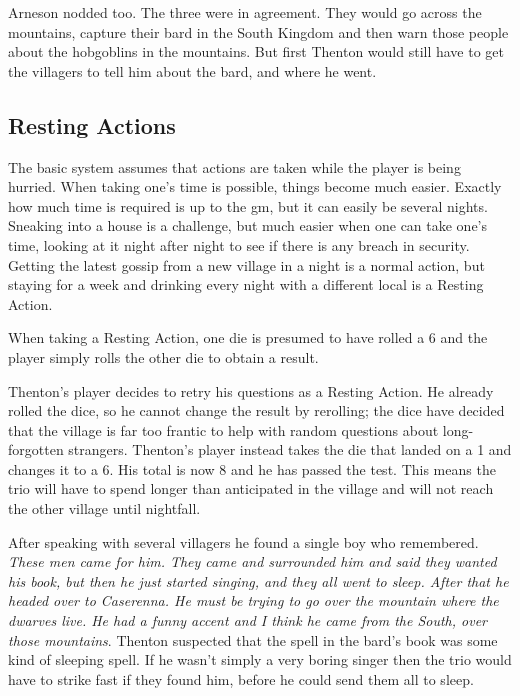 \begin{multicols}{2}
\begin{exampletext}
Arneson nodded too.
The three were in agreement.
They would go across the mountains, capture their bard in the South Kingdom and then warn those people about the hobgoblins in the mountains.
But first Thenton would still have to get the villagers to tell him about the bard, and where he went.\end{exampletext}

\subsection{Resting Actions}\label{restingactions}

The basic system assumes that actions are taken while the player is being hurried. When taking one's time is possible, things become much easier. Exactly how much time is required is up to the \gls{gm}, but it can easily be several nights. Sneaking into a house is a challenge, but much easier when one can take one's time, looking at it night after night to see if there is any breach in security. Getting the latest gossip from a new village in a night is a normal action, but staying for a week and drinking every night with a different local is a Resting Action.

When taking a Resting Action, one die is presumed to have rolled a 6 and the player simply rolls the other die to obtain a result.

\begin{exampletext}

	Thenton's player decides to retry his questions as a Resting Action. He already rolled the dice, so he cannot change the result by rerolling; the dice have decided that the village is far too frantic to help with random questions about long-forgotten strangers. Thenton's player instead takes the die that landed on a 1 and changes it to a 6. His total is now 8 and he has passed the test. This means the trio will have to spend longer than anticipated in the village and will not reach the other village until nightfall.

	After speaking with several villagers he found a single boy who remembered. \emph{These men came for him. They came and surrounded him and said they wanted his book, but then he just started singing, and they all went to sleep. After that he headed over to Caserenna. He must be trying to go over the mountain where the dwarves live. He had a funny accent and I think he came from the South, over those mountains}. Thenton suspected that the spell in the bard's book was some kind of sleeping spell. If he wasn't simply a very boring singer then the trio would have to strike fast if they found him, before he could send them all to sleep.


\end{exampletext}
\end{multicols}
